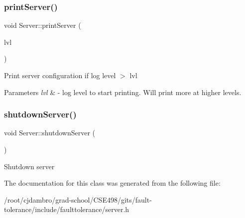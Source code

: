 \subsubsection{\texorpdfstring{print\+Server()}{printServer()}}
{\footnotesize\ttfamily void Server\+::print\+Server (\begin{DoxyParamCaption}\item[{const Log\+Level}]{lvl }\end{DoxyParamCaption})}

Print server configuration if log level $>$ lvl


\begin{DoxyParams}{Parameters}
{\em lvl} & -\/ log level to start printing. Will print more at higher levels. \\
\hline
\end{DoxyParams}
\mbox{\label{classServer_a4ce7fd6ac1a1f940db29e57f5f33ae9b}} 
\subsubsection{\texorpdfstring{shutdown\+Server()}{shutdownServer()}}
{\footnotesize\ttfamily void Server\+::shutdown\+Server (\begin{DoxyParamCaption}{ }\end{DoxyParamCaption})}

Shutdown server 

The documentation for this class was generated from the following file\+:\begin{DoxyCompactItemize}
\item 
/root/cjdambro/grad-\/school/\+C\+S\+E498/gits/fault-\/tolerance/include/faulttolerance/server.\+h\end{DoxyCompactItemize}

